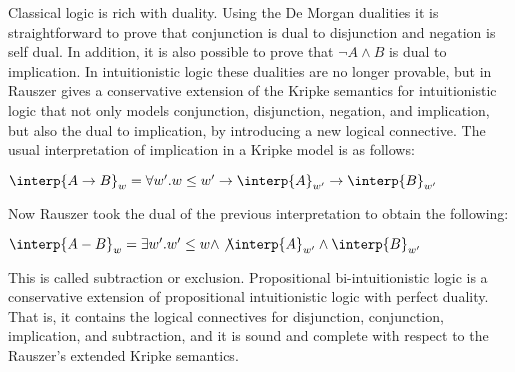 \newcommand{\redtoby}[1]{\stackrel{ \ifrName{({\tiny #1})}}{\redto}}



\newcommand{\ifrName}[1]{\textsc{#1}}

\newcommand{\ndto}[1]{\to_{#1}}
\newcommand{\ndwedge}[1]{\wedge_{#1}}

\newcommand{\To}[0]{\Rightarrow}
\newcommand{\SN}[0]{\mathbf{SN}} 
Classical logic is rich with duality.  Using the De Morgan dualities
it is straightforward to prove that conjunction is dual to disjunction
and negation is self dual.  In addition, it is also possible to prove
that $\lnot A \land B$ is dual to implication.  In intuitionistic
logic these dualities are no longer provable, but in
\cite{Rauszer:1974} Rauszer gives a conservative extension of the
Kripke semantics for intuitionistic logic that not only models
conjunction, disjunction, negation, and implication, but also the dual
to implication, by introducing a new logical connective. The usual
interpretation of implication in a Kripke model is as follows:
\begin{center}
  \begin{math}
    \interp{A \to B}_w = \forall w'.w \leq w' \to \interp{A}_{w'} \to \interp{B}_{w'}
  \end{math}
\end{center}
Now Rauszer took the dual of the previous interpretation to obtain the following:
\begin{center}
  \begin{math}
    \interp{A - B}_w = \exists w'.w' \leq w \land \not\interp{A}_{w'} \land \interp{B}_{w'}
  \end{math}
\end{center}
This is called subtraction or exclusion.  Propositional
bi-intuitionistic logic is a conservative extension of propositional
intuitionistic logic with perfect duality.  That is, it contains the
logical connectives for disjunction, conjunction, implication, and
subtraction, and it is sound and complete with respect to the
Rauszer's extended Kripke semantics.

